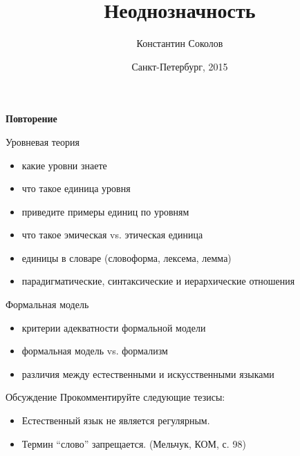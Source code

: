 \documentclass{beamer}
\begin{document}
\title{\large{\sc Неоднозначность}}
\author{Константин Соколов}
\date{Санкт-Петербург, 2015} 

\begin{frame}
    \thispagestyle{empty}
    \titlepage
\end{frame}



\begin{frame}{}
\begin{center}
	\textbf{Повторение}
\end{center}
\end{frame}

\begin{frame}{Уровневая теория}
\setcounter{framenumber}{1}
\begin{itemize}
    \item какие уровни знаете
    \item что такое единица уровня
    \item приведите примеры единиц по уровням
    \item что такое эмическая vs. этическая единица
    \item единицы в словаре (словоформа, лексема, лемма)
    \item парадигматические, синтаксические и иерархические отношения
\end{itemize}
\end{frame}

\begin{frame}{Формальная модель}
\begin{itemize}
	\item критерии адекватности формальной модели
	\item формальная модель vs. формализм
	\item различия между естественными и искусственными языками
\end{itemize}
\end{frame}

\begin{frame}{Обсуждение}
Прокомментируйте следующие тезисы:\\
\medskip
\begin{itemize}
	\item Естественный язык не является регулярным.
	\item Термин ``слово'' запрещается. (Мельчук, КОМ, с. 98)
\end{itemize}
\end{frame}
\end{document}

